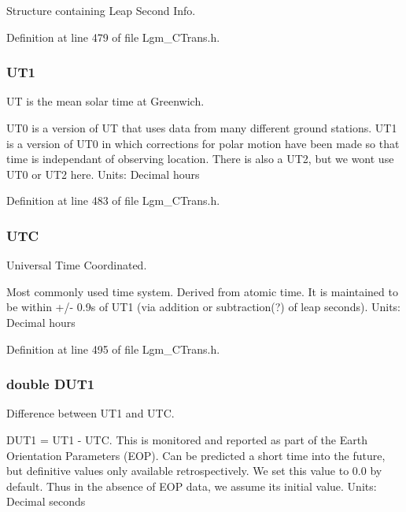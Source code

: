 Structure containing Leap Second Info. 



Definition at line 479 of file Lgm\_\-CTrans.h.\hypertarget{struct_lgm___c_trans_962e9f1b4229ffbb70a070090d8a021e}{
\subsubsection[{UT1}]{ {\bf UT1}}}
\label{struct_lgm___c_trans_962e9f1b4229ffbb70a070090d8a021e}


UT is the mean solar time at Greenwich. 

UT0 is a version of UT that uses data from many different ground stations. UT1 is a version of UT0 in which corrections for polar motion have been made so that time is independant of observing location. There is also a UT2, but we wont use UT0 or UT2 here. Units: Decimal hours 

Definition at line 483 of file Lgm\_\-CTrans.h.\hypertarget{struct_lgm___c_trans_ffd6d677453dac5266c9172c6ff2d9b7}{
\subsubsection[{UTC}]{ {\bf UTC}}}
\label{struct_lgm___c_trans_ffd6d677453dac5266c9172c6ff2d9b7}


Universal Time Coordinated. 

Most commonly used time system. Derived from atomic time. It is maintained to be within +/- 0.9s of UT1 (via addition or subtraction(?) of leap seconds). Units: Decimal hours 

Definition at line 495 of file Lgm\_\-CTrans.h.\hypertarget{struct_lgm___c_trans_3711c22856595eb27022ddb8680cec06}{
\subsubsection[{DUT1}]{\setlength{\rightskip}{0pt plus 5cm}double {\bf DUT1}}}
\label{struct_lgm___c_trans_3711c22856595eb27022ddb8680cec06}


Difference between UT1 and UTC. 

DUT1 = UT1 - UTC. This is monitored and reported as part of the Earth Orientation Parameters (EOP). Can be predicted a short time into the future, but definitive values only available retrospectively. We set this value to 0.0 by default. Thus in the absence of EOP data, we assume its initial value. Units: Decimal seconds 

